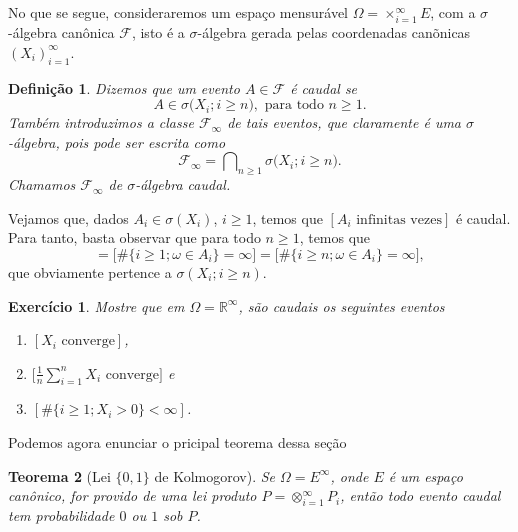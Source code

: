 \documentclass[reqno, draft]{book}
\newcommand*\1{\mathds{1}}
\newtheorem{theorem}{Teorema}[section]
\newtheorem{definition}[theorem]{Definição}
\newtheorem{exercise}[example]{Exercício}
\DeclareMathOperator*{\mcap}{{\textstyle \bigcap}}
\begin{document}
No que se segue, consideraremos um espaço mensurável $\Omega = \times_{i=1}^\infty E$, com a $\sigma$-álgebra canônica $\mathcal{F}$, isto é a $\sigma$-álgebra gerada pelas coordenadas canõnicas $(X_i)_{i=1}^\infty$.
\begin{definition}
  Dizemos que um evento $A \in \mathcal{F}$ é caudal se
  \begin{equation}
    A \in \sigma\big( X_i; i \geq n\big), \text{ para todo $n \geq 1$}.
  \end{equation}
  Também introduzimos a classe $\mathcal{F}_\infty$ de tais eventos, que claramente é uma $\sigma$-álgebra, pois pode ser escrita como
  \begin{equation}
    \mathcal{F}_\infty = \mcap_{n \geq 1} \sigma\big( X_i; i \geq n\big).
  \end{equation}
  Chamamos $\mathcal{F}_\infty$ de $\sigma$-álgebra caudal. 
\end{definition}

Vejamos que, dados $A_i \in \sigma(X_i)$, $i \geq 1$, temos que $[A_i \text{ infinitas vezes}]$ é caudal.
Para tanto, basta observar que para todo $n \geq 1$, temos que
\begin{equation*}
  [A_i \text{ infinitas vezes}] = \big[\#\{i \geq 1; \omega \in A_i\} = \infty\big] = \big[\#\{i \geq n; \omega \in A_i\} = \infty\big],
\end{equation*}
que obviamente pertence a $\sigma(X_i; i \geq n)$.

\begin{exercise}
  Mostre que em $\Omega = \mathbb{R}^{\infty}$, são caudais os seguintes eventos
  \begin{enumerate}[\quad a)]
  \item $[X_i \text{ converge}]$,
  \item $\big[\tfrac{1}{n} \sum_{i=1}^n X_i \text{ converge}\big]$ e
  \item $[\#\{i \geq 1; X_i > 0\} < \infty]$.
  \end{enumerate}
\end{exercise}

Podemos agora enunciar o pricipal teorema dessa seção

\begin{theorem}[Lei $\{0,1\}$ de Kolmogorov]
  Se $\Omega = E^{\infty}$, onde $E$ é um espaço canônico, for provido de uma lei produto $P = \otimes_{i=1}^\infty P_i$, então todo evento caudal tem probabilidade $0$ ou $1$ sob $P$.
\end{theorem}
\end{document}
